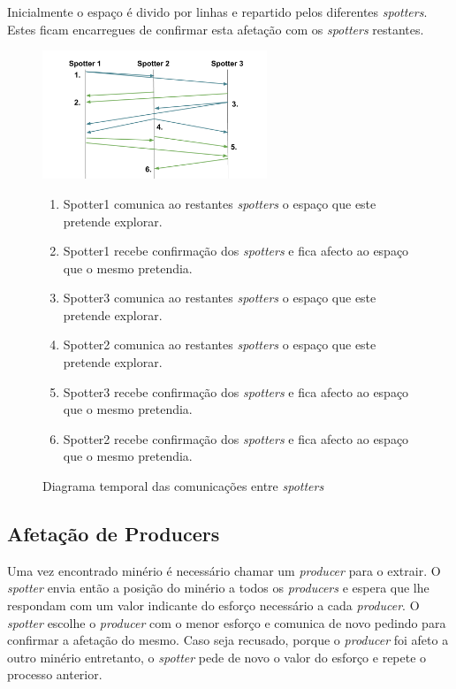 \documentclass[12pt]{report}
\begin{document}
Inicialmente o espaço é divido por linhas e repartido pelos diferentes \emph{spotters}. Estes ficam encarregues de confirmar esta
afetação com os \emph{spotters} restantes.

\begin{figure}[h]
  \centering
    \includegraphics[width=0.6\textwidth]{spotter-agreement}
  \caption{\small{Diagrama temporal das comunicações entre \emph{spotters}}}
  
  \begin{enumerate}
    \item Spotter1 comunica ao restantes \emph{spotters} o espaço que este pretende explorar.
    \item Spotter1 recebe confirmação dos \emph{spotters} e fica afecto ao espaço que o mesmo pretendia.
    \item Spotter3 comunica ao restantes \emph{spotters} o espaço que este pretende explorar.
    \item Spotter2 comunica ao restantes \emph{spotters} o espaço que este pretende explorar.
    \item Spotter3 recebe confirmação dos \emph{spotters} e fica afecto ao espaço que o mesmo pretendia.
    \item Spotter2 recebe confirmação dos \emph{spotters} e fica afecto ao espaço que o mesmo pretendia.
  \end{enumerate}
\end{figure}

\FloatBarrier
\newpage
\subsection{Afetação de Producers}
Uma vez encontrado minério é necessário chamar um \emph{producer} para o extrair. O \emph{spotter} envia então a posição do 
minério a todos os \emph{producers} e espera que lhe respondam com um valor indicante do esforço necessário a cada \emph{producer}.
O \emph{spotter} escolhe o \emph{producer} com o menor esforço e comunica de novo pedindo para confirmar a afetação do mesmo.
Caso seja recusado, porque o \emph{producer} foi afeto a outro minério entretanto, o \emph{spotter} pede de novo o valor do esforço
e repete o processo anterior.
\end{document}
